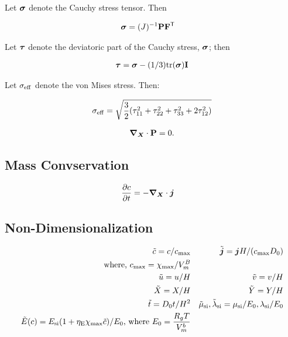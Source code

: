 \documentclass[../main.tex]{subfiles}
\begin{document}
Let $\bm{\sigma}$ denote the Cauchy stress tensor. Then

\begin{align}
    \bm{\sigma} &= (J)^{-1} \mathbf{P} \mathbf{F}^{\sf {T}} 
\end{align}




Let $\bm{\tau}$ denote the deviatoric part of the Cauchy stress, $\bm{\sigma}$; then

\begin{align}
    \bm{\tau} &= \bm{\sigma} - (1/3)\rm{tr}(\bm{\sigma})\mathbf{I} \\
\end{align}


Let $\sigma_{\rm{eff}}$ denote the von Mises stress. Then:

\begin{align}
    \sigma_{\rm{eff}} = \sqrt{\frac{3}{2}{(\tau^2_{11} + \tau^2_{22} + \tau^2_{33}} + 2\tau^2_{12})}
\end{align}


\begin{gather}
\bm{\nabla}_{\bm{X}} \cdot \mathbf{P} = 0.
\end{gather}

\subsection{Mass Convservation}
\begin{align}
    \frac{\partial c}{\partial t} &= - \bm{\nabla}_{\bm{X}} \cdot \bm{j}
\end{align}

\subsection{Non-Dimensionalization}
\begin{align*}
    \tilde{c} = c/c_{\rm{max}} && \tilde{\bm{j}} = \bm{j} H/({c_{\rm{max}}} D_0) \\ \text{where, } {c_{\rm{max}}} = \chi_{\rm max}/V_m^B \\
    \tilde{u} = u/H && \tilde{v} = v/H \\
    \tilde{X} = X/H && \tilde{Y} = Y/H \\
    \tilde{t} = D_0 t/H^2 && \tilde{\mu}_{\text{si}}, \tilde{\lambda}_{\text{si}} = \mu_{\text{si}}/E_0, \lambda_{\text{si}}/E_0 \\
    \tilde{E}(c) = E_{\text{si}}(1 + \eta_{\rm{E}} \chi_{\rm{max}} \tilde{c})/E_0 \text{, where }  E_0 = \frac{R_g T}{V_m^b} \\
\end{align*}
\end{document}

